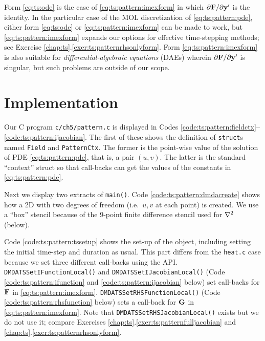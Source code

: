 Form \eqref{eq:ts:ode} is the case of \eqref{eq:ts:pattern:imexform} in which $\partial \mathbf{F}/\partial \mathbf{y}'$ is the identity.  In the particular case of the MOL discretization of \eqref{eq:ts:pattern:pde}, either form \eqref{eq:ts:ode} or \eqref{eq:ts:pattern:imexform} can be made to work, but \eqref{eq:ts:pattern:imexform} expands our options for effective time-stepping methods; see Exercise \ref{chap:ts}.\ref{exer:ts:patternrhsonlyform}.  Form \eqref{eq:ts:pattern:imexform} is also suitable for \emph{differential-algebraic equations} (DAEs) wherein $\partial \mathbf{F}/\partial \mathbf{y}'$ is singular, but such problems are outside of our scope.



\section{Implementation}

Our C program \texttt{c/ch5/pattern.c} is displayed in Codes \ref{code:ts:pattern:fieldctx}--\ref{code:ts:pattern:ijacobian}.  The first of these shows the definition of \texttt{struct}s named \texttt{Field} and \texttt{PatternCtx}.  The former is the point-wise value of the solution of PDE \eqref{eq:ts:pattern:pde}, that is, a pair $(u,v)$.  The latter is the standard ``context'' struct so that call-backs can get the values of the constants in \eqref{eq:ts:pattern:pde}.


Next we display two extracts of \texttt{main()}.  Code \ref{code:ts:pattern:dmdacreate} shows how a 2D \pDMDA with two degrees of freedom (i.e.~$u,v$ at each point) is created.  We use a ``box'' stencil because of the 9-point finite difference stencil used for $\nabla^2$ (below).


Code \ref{code:ts:pattern:tssetup} shows the set-up of the \pTS object, including setting the initial time-step and duration as usual.  This part differs from the \texttt{heat.c} case because we set three different call-backs using the \PETSc API.  \texttt{DMDATSSetIFunctionLocal()} and \texttt{DMDATSSetIJacobianLocal()} (Code \ref{code:ts:pattern:ifunction} and \ref{code:ts:pattern:ijacobian} below) set call-backs for $\mathbf{F}$ in \eqref{eq:ts:pattern:imexform}.  \texttt{DMDATSSetRHSFunctionLocal()} (Code \ref{code:ts:pattern:rhsfunction} below) sets a call-back for $\mathbf{G}$ in \eqref{eq:ts:pattern:imexform}.  Note that \texttt{DMDATSSetRHSJacobianLocal()} exists but we do not use it; compare Exercises \ref{chap:ts}.\ref{exer:ts:patternfulljacobian} and \ref{chap:ts}.\ref{exer:ts:patternrhsonlyform}.

